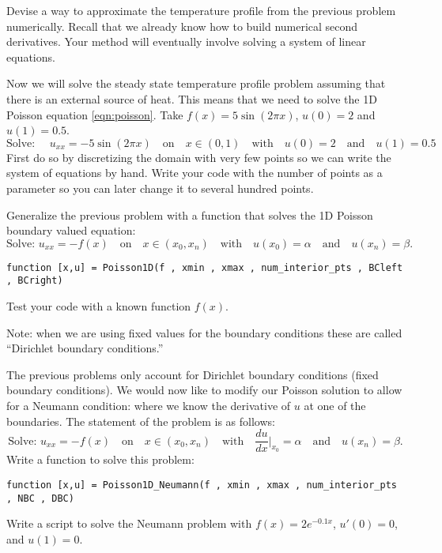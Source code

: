 \begin{problem}
    Devise a way to approximate the temperature profile from the previous problem
    numerically.  Recall that we already know how to build numerical second derivatives.
    Your method will eventually involve solving a system of linear equations.
\end{problem}

\begin{problem}
    Now we will solve the steady state temperature profile problem assuming that there is
    an external source of heat.  This means that we need to solve the 1D Poisson equation
    \eqref{eqn:poisson}.  Take $f(x) = 5\sin(2 \pi x)$, $u(0) = 2$ and $u(1) = 0.5$.
    \[ \text{Solve: } \quad u_{xx} = -5\sin(2\pi x) \quad \text{on} \quad x \in (0,1)
    \quad \text{with} \quad u(0)=2 \quad \text{and} \quad u(1) = 0.5 \]
    First do so by discretizing the domain with very few points so we can write the system
    of equations by hand.  Write your code with the number of points as a parameter so you
    can later change it to several hundred points.
\end{problem}

\begin{problem}
    Generalize the previous problem with a \ProgLang function that solves the 1D Poisson
    boundary valued equation:
    \[ \text{Solve: } u_{xx} = - f(x) \quad \text{on} \quad x \in (x_0,x_n) \quad \text{with} \quad
    u(x_0) = \alpha \quad \text{and} \quad u(x_n) = \beta. \]
\begin{lstlisting}
function [x,u] = Poisson1D(f , xmin , xmax , num_interior_pts , BCleft , BCright)
\end{lstlisting}
    Test your code with a known function $f(x)$.

    Note: when we are using fixed values for the boundary conditions these are called
    ``Dirichlet boundary conditions.''
\end{problem}



\begin{problem}
The previous problems only account for Dirichlet boundary conditions (fixed boundary
conditions).  We would now like to modify our Poisson solution to allow for a Neumann
condition: where we know the derivative of $u$ at one of the boundaries.  The
statement of the problem is as follows:
    \[ \text{Solve: } u_{xx} = - f(x) \quad \text{on} \quad x \in (x_0,x_n) \quad \text{with} \quad
    \frac{du}{dx}\Big|_{x_0} = \alpha \quad \text{and} \quad u(x_n) = \beta. \]
    Write a function to solve this problem:
\begin{lstlisting}
function [x,u] = Poisson1D_Neumann(f , xmin , xmax , num_interior_pts , NBC , DBC)
\end{lstlisting}

    Write a \ProgLang script to solve the Neumann problem with $f(x) = 2e^{-0.1x}$, $u'(0)=0$,
    and $u(1)=0$.
\end{problem}

